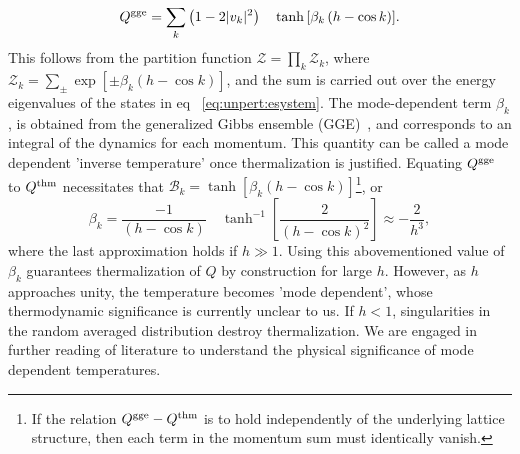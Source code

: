 \documentclass[a4paper,10pt]{report}
\begin{document}
\begin{equation}
\label{eq:thermalmag}
Q^{\rm gge} = \sum_{k} \left(1-2|v_k|^2\right)\quad \tanh{\left[\beta_k\left(h-\cos{k}\right)\right]}.
\end{equation}
This follows from the partition function $\mathcal{Z}=\prod_k \mathcal{Z}_k$, where $\mathcal{Z}_k=\sum_{\pm}\exp{\left[\pm\beta_k\left(h-\cos{k}\right)\right]}$, and the sum is carried out over the energy eigenvalues of the states in eq \ \ref{eq:unpert:esystem}. The mode-dependent term $\beta_k$, is obtained from the generalized Gibbs ensemble (GGE)\ \cite{rigol:nature, krishnenduda:ethreview}, and corresponds to an integral of the dynamics for each momentum. This quantity can be called a mode dependent 'inverse temperature' once thermalization is justified. Equating $Q^{\rm gge}$ to $Q^{\rm thm}$ necessitates that $\mathcal{B}_k=\tanh{\left[\beta_k\left(h-\cos{k}\right)\right]}$\footnote{If the relation $Q^{\rm gge}-Q^{\rm thm}$ is to hold independently of the underlying lattice structure, then each term in the momentum sum must identically vanish.}, or
\begin{equation}
\label{eq:invtemp}
\beta_k = \frac{-1}{\left(h-\cos{k}\right)}\quad \tanh^{-1}{\left[\frac{2}{\left(h-\cos{k}\right)^2}\right]}\approx-\frac{2}{h^3},
\end{equation}
where the last approximation holds if $h\gg1$. Using this abovementioned value of $\beta_k$ guarantees thermalization of $Q$ by construction for large $h$. However, as $h$ approaches unity, the temperature becomes 'mode dependent', whose thermodynamic significance is currently unclear to us. If $h<1$, singularities in the random averaged distribution destroy thermalization. We are engaged in further reading of literature to understand the physical significance of mode dependent temperatures.
\end{document}

